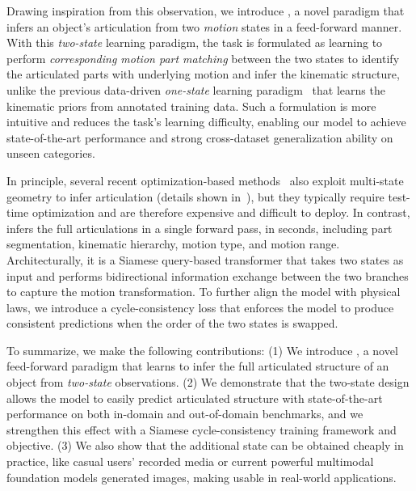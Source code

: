 Drawing inspiration from this observation, we introduce \method, a novel paradigm that infers an object's articulation from two \emph{motion} states in a feed-forward manner.
With this \emph{two-state} learning paradigm, the task is formulated as learning to perform \emph{corresponding motion part matching} between the two states to identify the articulated parts with underlying motion and infer the kinematic structure, unlike the previous data-driven \emph{one-state} learning paradigm~\cite{che2024op,Goyal_2025_ICCV,li2025particulate} that learns the kinematic priors from annotated training data.
Such a formulation is more intuitive and reduces the task's learning difficulty,
enabling our model to achieve state-of-the-art performance and strong cross-dataset generalization ability on unseen categories.

In principle, several recent optimization-based methods~\cite{liu2023paris,chen2025freeart3d,ai2026aim} also exploit multi-state geometry to infer articulation (details shown in~), but they typically require test-time optimization and are therefore expensive and difficult to deploy.
In contrast, \method infers the full articulations in a single forward pass, in seconds, including part segmentation, kinematic hierarchy, motion type, and motion range.
Architecturally, it is a Siamese query-based transformer that takes two states as input and performs bidirectional information exchange between the two branches to capture the motion transformation.
To further align the model with physical laws, we introduce a cycle-consistency loss that enforces the model to produce consistent predictions when the order of the two states is swapped.

To summarize, we make the following contributions:
(1) We introduce \method, a novel feed-forward paradigm that learns to infer the full articulated structure of an object from \emph{two-state} observations.
(2) We demonstrate that the two-state design allows the model to easily predict articulated structure with state-of-the-art performance on both in-domain and out-of-domain benchmarks, and we strengthen this effect with a Siamese cycle-consistency training framework and objective.
(3) We also show that the additional state can be obtained cheaply in practice, like casual users' recorded media or current powerful multimodal foundation models generated images, making \method usable in real-world applications.




